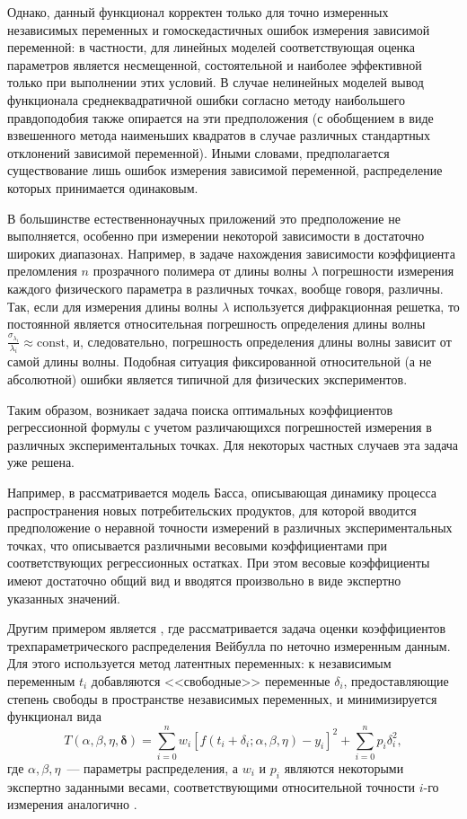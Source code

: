 \documentclass[tikz,10pt,a4paper]{article}
\begin{document}
Однако, данный функционал корректен только для точно измеренных независимых
переменных и гомоскедастичных ошибок измерения зависимой переменной:
в частности, для линейных моделей соответствующая оценка параметров является
несмещенной, состоятельной и наиболее эффективной только при выполнении этих
условий. В случае нелинейных моделей вывод функционала среднеквадратичной
ошибки согласно методу наибольшего правдоподобия также опирается на
эти предположения (с обобщением в виде взвешенного метода наименьших
квадратов в случае различных стандартных отклонений зависимой
переменной).
Иными словами, предполагается существование лишь ошибок измерения зависимой
переменной, распределение которых принимается одинаковым.

В большинстве естественнонаучных приложений это предположение не выполняется,
особенно при измерении некоторой зависимости в достаточно широких диапазонах.
Например, в задаче нахождения зависимости коэффициента преломления $n$ прозрачного
полимера от длины волны $\lambda$ погрешности измерения каждого физического
параметра в различных точках, вообще говоря, различны\cite{Rudoy15MonteCarlo}.
Так, если для измерения длины волны $\lambda$ используется дифракционная
решетка, то постоянной является относительная погрешность определения длины волны
$\frac{\sigma_{\lambda_i}}{\lambda_i} \approx \text{const}$, и, следовательно,
погрешность определения длины волны зависит от самой длины волны. Подобная ситуация
фиксированной относительной (а не абсолютной) ошибки является типичной для
физических экспериментов.

Таким образом, возникает задача поиска оптимальных коэффициентов регрессионной
формулы с учетом различающихся погрешностей измерения в различных экспериментальных точках.
Для некоторых частных случаев эта задача уже решена.

Например, в \cite{jukic2013nonlinear} рассматривается модель Басса,
описывающая динамику процесса распространения новых потребительских продуктов,
для которой вводится предположение о неравной точности измерений в различных
экспериментальных точках, что описывается различными весовыми коэффициентами при
соответствующих регрессионных остатках. При этом весовые коэффициенты имеют достаточно
общий вид и вводятся произвольно в виде экспертно указанных значений.

Другим примером является \cite{jukic2010nonlinear}, где рассматривается задача оценки коэффициентов
трехпараметрического распределения Вейбулла по неточно измеренным данным.
Для этого используется метод латентных переменных: к
независимым переменным $t_i$ добавляются <<свободные>> переменные $\delta_i$,
предоставляющие степень свободы в пространстве независимых переменных, и минимизируется
функционал вида
\[
  T(\alpha, \beta, \eta, \boldsymbol{\delta}) = \sum_{i = 0}^n w_i [f(t_i + \delta_i; \alpha, \beta, \eta) - y_i]^2 + \sum_{i = 0}^n p_i \delta_i^2,
\]
где $\alpha, \beta, \eta$~--- параметры распределения, а $w_i$ и $p_i$ являются
некоторыми экспертно заданными весами, соответствующими относительной точности
$i$-го измерения аналогично \cite{jukic2013nonlinear}.
\end{document}
